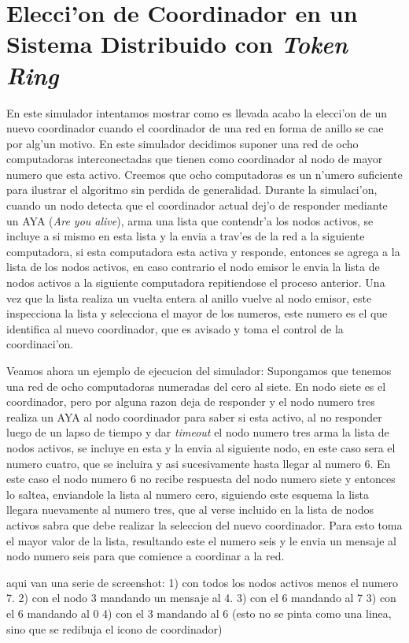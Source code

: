 \section{Elecci'on de Coordinador en un Sistema Distribuido con \emph{Token Ring}}
En este simulador intentamos mostrar como es llevada acabo la elecci'on de un
nuevo coordinador cuando el coordinador de una red en forma de anillo se cae
por alg'un motivo.
En este simulador decidimos suponer una red de ocho computadoras interconectadas que tienen como coordinador al nodo de mayor numero que esta activo. Creemos que ocho computadoras es un n'umero suficiente para ilustrar el algoritmo sin perdida de generalidad.
Durante la simulaci'on, cuando un nodo detecta que el coordinador actual dej'o de responder
mediante un AYA (\emph{Are you alive}), arma una lista que contendr'a los nodos
activos, se incluye a si mismo en esta lista y la envia a trav'es de la red a la siguiente computadora, si esta computadora esta activa y responde, entonces se agrega a la lista de los nodos activos, en caso contrario el nodo emisor le envia la lista de nodos activos a la siguiente computadora repitiendose el proceso anterior. Una vez que la lista realiza un vuelta entera al anillo vuelve al nodo emisor, este inspecciona la lista y selecciona el mayor de los numeros, este numero es el que identifica al nuevo coordinador, que es avisado y toma el control de la coordinaci'on.

Veamos ahora un ejemplo de ejecucion del simulador:
Supongamos que tenemos una red de ocho computadoras numeradas del cero al siete. En nodo siete es el coordinador, pero por alguna razon deja de responder y el nodo numero tres realiza un AYA al nodo coordinador para saber si esta activo, al no responder luego de un lapso de tiempo y dar \emph{timeout} el nodo numero tres arma la lista de nodos activos, se incluye en esta y la envia al siguiente nodo, en este caso sera el numero cuatro, que se incluira y asi sucesivamente hasta llegar al numero 6. En este caso el nodo numero 6 no recibe respuesta del nodo numero siete y entonces lo saltea, enviandole la lista al numero cero, siguiendo este esquema la lista llegara nuevamente al numero tres, que al verse incluido en la lista de nodos activos sabra que debe realizar la seleccion del nuevo coordinador. Para esto toma el mayor valor de la lista, resultando este el numero seis y le envia un mensaje al nodo numero seis para que comience a coordinar a la red.

aqui van una serie de screenshot: 
1) con todos los nodos activos menos el numero 7.
2) con el nodo 3 mandando un mensaje al 4.
3) con el 6 mandando al 7
3) con el 6 mandando al 0
4) con el 3 mandando al 6 (esto no se pinta como una linea, sino que se redibuja el icono de coordinador)

